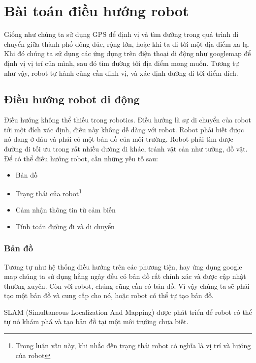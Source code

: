 {\section{Bài toán điều hướng robot }


  Giống như chúng ta sử dụng GPS để định vị và tìm đường trong quá trình di chuyển giữa thành phố đông đúc, rộng lớn, hoặc khi ta đi tới một địa điểm xa lạ. Khi đó chúng ta sử dụng các ứng dụng trên điện thoại di động như googlemap để định vị vị trí của mình, sau đó tìm đường tới địa điểm mong muốn. Tương tự như vậy, robot tự hành cũng cần định vị, và xác định đường đi tới điểm đích.

\subsection{Điều hướng robot di động}

Điều hướng không thể thiếu trong robotics. Điều hướng là sự di chuyển của robot tới một đích xác định, điều này không dễ dàng với robot. Robot phải biết được nó đang ở đâu và phải có một bản đồ của môi trường. Robot phải tìm được đường đi tối ưu trong rất nhiều đường đi khác, tránh vật cản như tường, đồ vật. Để có thể điều hướng robot, cần những yếu tố sau:
\begin{itemize}
  \item Bản đồ
  \item Trạng thái của robot\footnote{Trong luận văn này, khi nhắc đến trạng thái robot có nghĩa là vị trí và hướng của robot}
  \item Cảm nhận thông tin từ cảm biến
  \item Tính toán đường đi và di chuyển
\end{itemize}

\subsubsection*{Bản đồ}
Tương tự như hệ thống điều hướng trên các phương tiện, hay ứng dụng google map chúng ta sử dụng hằng ngày đều có bản đồ rất chính xác và được cập nhật thường xuyên. Còn với robot, chúng cũng cần có bản đồ. Vì vậy chúng ta sẽ phải tạo một bản đồ và cung cấp cho nó, hoặc robot có thể tự tạo bản đồ.

SLAM (Simultaneous Localization And Mapping) được phát triển để robot có thể tự nó khám phá và tạo bản đồ tại một môi trường chưa biết.

}
